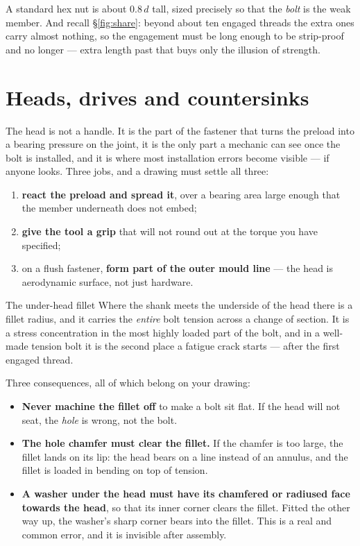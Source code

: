 \documentclass[11pt,a4paper]{article}
\begin{document}
\medskip
A standard hex nut is about $0.8\,d$ tall, sized precisely so that the \emph{bolt} is the weak member.
And recall \S\ref{fig:share}: beyond about ten engaged threads the extra ones carry almost nothing, so
the engagement must be long enough to be strip-proof and no longer --- extra length past that buys
only the illusion of strength.

\section{Heads, drives and countersinks}
\label{sec:heads}

The head is not a handle. It is the part of the fastener that turns the preload into a bearing
pressure on the joint, it is the only part a mechanic can see once the bolt is installed, and it
is where most installation errors become visible --- if anyone looks. Three jobs, and a drawing
must settle all three:

\begin{enumerate}[leftmargin=*,itemsep=1pt]
\item \textbf{react the preload and spread it}, over a bearing area large enough that the member
  underneath does not embed;
\item \textbf{give the tool a grip} that will not round out at the torque you have specified;
\item on a flush fastener, \textbf{form part of the outer mould line} --- the head is aerodynamic
  surface, not just hardware.
\end{enumerate}

\begin{keybox}{The under-head fillet}
Where the shank meets the underside of the head there is a fillet radius, and it carries the
\emph{entire} bolt tension across a change of section. It is a stress concentration in the most
highly loaded part of the bolt, and in a well-made tension bolt it is the second place a fatigue
crack starts --- after the first engaged thread.

\medskip
Three consequences, all of which belong on your drawing:
\begin{itemize}[leftmargin=*,itemsep=1pt]
\item \textbf{Never machine the fillet off} to make a bolt sit flat. If the head will not seat,
  the \emph{hole} is wrong, not the bolt.
\item \textbf{The hole chamfer must clear the fillet.} If the chamfer is too large, the fillet
  lands on its lip: the head bears on a line instead of an annulus, and the fillet is loaded in
  bending on top of tension.
\item \textbf{A washer under the head must have its chamfered or radiused face towards the head},
  so that its inner corner clears the fillet. Fitted the other way up, the washer's sharp corner
  bears into the fillet. This is a real and common error, and it is invisible after assembly.
\end{itemize}
\end{keybox}
\end{document}
